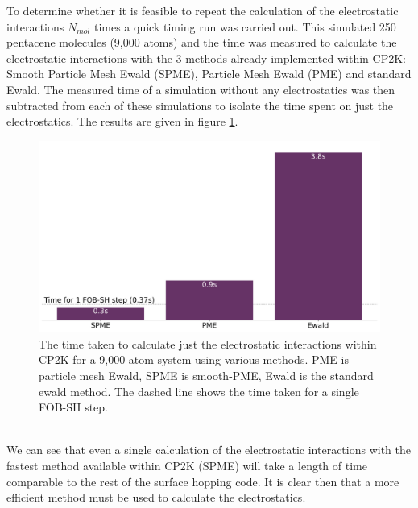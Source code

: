 To determine whether it is feasible to repeat the calculation of the electrostatic interactions $N_{mol}$ times a quick timing run was carried out. This simulated 250 pentacene molecules (9,000 atoms) and the time was measured to calculate the electrostatic interactions with the 3 methods already implemented within CP2K: Smooth Particle Mesh Ewald (SPME), Particle Mesh Ewald (PME) and standard Ewald. The measured time of a simulation without any electrostatics was then subtracted from each of these simulations to isolate the time spent on just the electrostatics. The results are given in figure  \ref{fig:ES_Timings}.
\begin{figure}[ht]
  \includegraphics[width=\textwidth]{./img/ES/InitialTimings.png}
  \caption{\label{fig:ES_Timings}The time taken to calculate just the electrostatic interactions within CP2K for a 9,000 atom system using various methods. PME is particle mesh Ewald, SPME is smooth-PME, Ewald is the standard ewald method. The dashed line shows the time taken for a single FOB-SH step.}
\end{figure}
\\
We can see that even a single calculation of the electrostatic interactions with the fastest method available within CP2K (SPME) will take a length of time comparable to the rest of the surface hopping code. It is clear then that a more efficient method must be used to calculate the electrostatics.
\\
